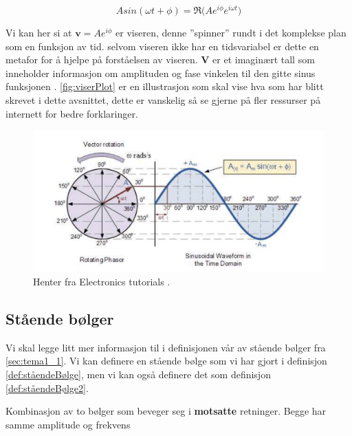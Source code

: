 \begin{equation}
    \label{eq:viser}
    Asin(\omega t +\phi) = \Re\bigg(Ae^{i\phi}e^{i\omega t}\bigg)
\end{equation}

Vi kan her si at $\textbf{v} = Ae^{i\phi}$ er viseren, denne ''spinner'' rundt i det komplekse plan som en funksjon av tid. selvom viseren ikke har en tidsvariabel er dette en metafor for å hjelpe på forståelsen av viseren. $\textbf{V}$ er et imaginært tall som inneholder informasjon om amplituden og fase vinkelen til den gitte sinus funksjonen \cite{EC10th}. \autoref{fig:viserPlot} er en illustrasjon som skal vise hva som har blitt skrevet i dette avsnittet, dette er vanskelig så se gjerne på fler ressurser på internett for bedre forklaringer.

\begin{figure}[!htb]
    \centering
    \includegraphics[scale=0.7]{Bilder/SamtaleTema1/viser.png}
    \caption{Henter fra Electronics tutorials \cite{electronics}.}
    \label{fig:viserPlot}
\end{figure}


\newpage
\subsection{Stående bølger}
\label{sec:tema1_4}
Vi skal legge litt mer informasjon til i definisjonen vår av stående bølger fra \autoref{sec:tema1_1}. Vi kan definere en stående bølge som vi har gjort i definisjon \autoref{def:ståendeBølge}, men vi kan også definere det som definisjon \autoref{def:ståendeBølge2}.

\begin{definition}
    \label{def:ståendeBølge2}
    Kombinasjon av to bølger som beveger seg i \textbf{motsatte} retninger. Begge har samme amplitude og frekvens
\end{definition}

